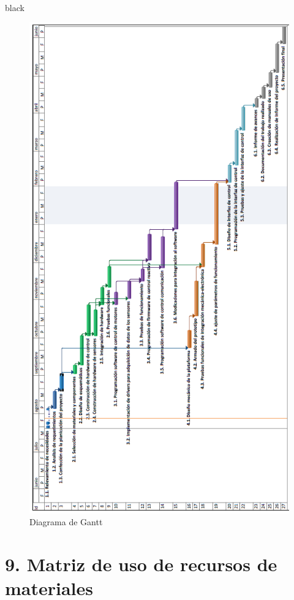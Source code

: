 \documentclass[11pt]{charter}
\begin{document}
\begin{consigna}{black}
\begin{figure}[htpb]
\centering 
\includegraphics[width=.8\textwidth]{./Figuras/Gantt.PNG}
\caption{Diagrama de Gantt}
\label{fig:gantt}
\end{figure}
\end{consigna}
\pagebreak

\section{9. Matriz de uso de recursos de materiales}
\label{sec:recursos}
\end{document}
